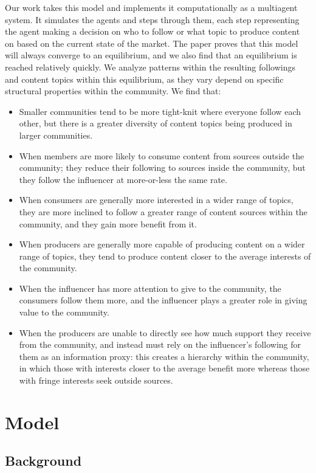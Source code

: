 \documentclass[11pt, letterpaper]{article}
\begin{document}
Our work takes this model and implements it computationally as a multiagent system. It simulates the agents and steps through them, each step representing the agent making a decision on who to follow or what topic to produce content on based on the current state of the market. The paper proves that this model will always converge to an equilibrium, and we also find that an equilibrium is reached relatively quickly. We analyze patterns within the resulting followings and content topics within this equilibrium, as they vary depend on specific structural properties within the community. We find that:
\begin{itemize}
    \item Smaller communities tend to be more tight-knit where everyone follow each other, but there is a greater diversity of content topics being produced in larger communities.
    \item When members are more likely to consume content from sources outside the community; they reduce their following to sources inside the community, but they follow the influencer at more-or-less the same rate.
    \item When consumers are generally more interested in a wider range of topics, they are more inclined to follow a greater range of content sources within the community, and they gain more benefit from it.
    \item When producers are generally more capable of producing content on a wider range of topics, they tend to produce content closer to the average interests of the community.
    \item When the influencer has more attention to give to the community, the consumers follow them more, and the influencer plays a greater role in giving value to the community.
    \item When the producers are unable to directly see how much support they receive from the community, and instead must rely on the influencer's following for them as an information proxy: this creates a hierarchy within the community, in which those with interests closer to the average benefit more whereas those with fringe interests seek outside sources.
\end{itemize}

\pagebreak

\section{Model}

\subsection{Background}
\end{document}
